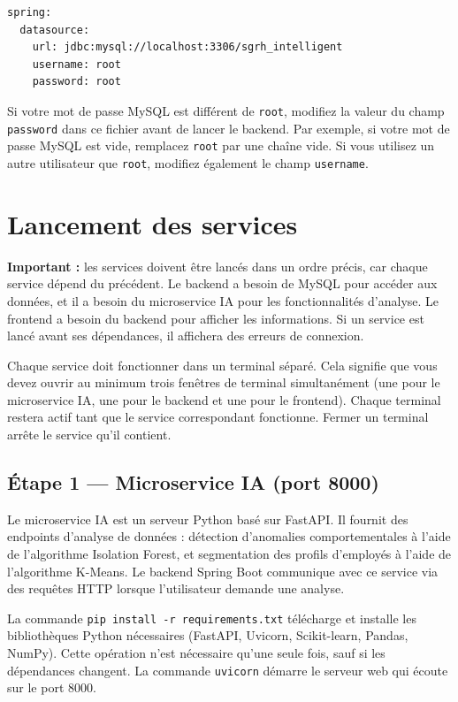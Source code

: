 \documentclass[12pt,a4paper]{report}
\begin{document}
\begin{verbatim}
spring:
  datasource:
    url: jdbc:mysql://localhost:3306/sgrh_intelligent
    username: root
    password: root
\end{verbatim}

Si votre mot de passe MySQL est différent de \texttt{root}, modifiez la valeur du champ \texttt{password} dans ce fichier avant de lancer le backend. Par exemple, si votre mot de passe MySQL est vide, remplacez \texttt{root} par une chaîne vide. Si vous utilisez un autre utilisateur que \texttt{root}, modifiez également le champ \texttt{username}.

\chapter{Lancement des services}

\textbf{Important :} les services doivent être lancés dans un ordre précis, car chaque service dépend du précédent. Le backend a besoin de MySQL pour accéder aux données, et il a besoin du microservice IA pour les fonctionnalités d'analyse. Le frontend a besoin du backend pour afficher les informations. Si un service est lancé avant ses dépendances, il affichera des erreurs de connexion.

Chaque service doit fonctionner dans un terminal séparé. Cela signifie que vous devez ouvrir au minimum trois fenêtres de terminal simultanément (une pour le microservice IA, une pour le backend et une pour le frontend). Chaque terminal restera actif tant que le service correspondant fonctionne. Fermer un terminal arrête le service qu'il contient.

\section{Étape 1 — Microservice IA (port 8000)}

Le microservice IA est un serveur Python basé sur FastAPI. Il fournit des endpoints d'analyse de données : détection d'anomalies comportementales à l'aide de l'algorithme Isolation Forest, et segmentation des profils d'employés à l'aide de l'algorithme K-Means. Le backend Spring Boot communique avec ce service via des requêtes HTTP lorsque l'utilisateur demande une analyse.

La commande \texttt{pip install -r requirements.txt} télécharge et installe les bibliothèques Python nécessaires (FastAPI, Uvicorn, Scikit-learn, Pandas, NumPy). Cette opération n'est nécessaire qu'une seule fois, sauf si les dépendances changent. La commande \texttt{uvicorn} démarre le serveur web qui écoute sur le port 8000.
\end{document}
